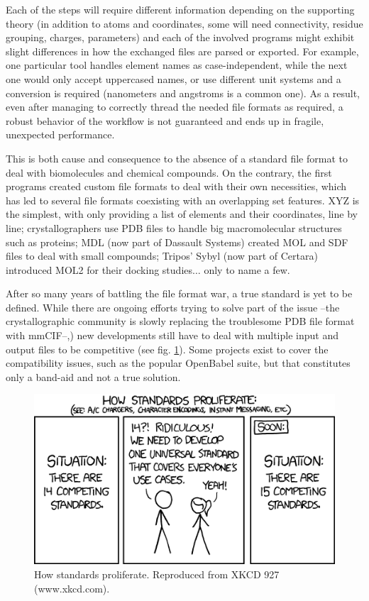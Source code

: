 Each of the steps will require different information depending on the supporting theory (in addition to atoms and coordinates, some will need connectivity, residue grouping, charges, parameters) and each of the involved programs might exhibit slight differences in how the exchanged files are parsed or exported. For example, one particular tool handles element names as case-independent, while the next one would only accept uppercased names, or use different unit systems and a conversion is required (nanometers and angstroms is a common one). As a result, even after managing to correctly thread the needed file formats as required, a robust behavior of the workflow is not guaranteed and ends up in fragile, unexpected performance.

This is both cause and consequence to the absence of a standard file format to deal with biomolecules and chemical compounds. On the contrary, the first programs created custom file formats to deal with their own necessities, which has led to several file formats coexisting with an overlapping set features. XYZ is the simplest, with only providing a list of elements and their coordinates, line by line; crystallographers use PDB files to handle big macromolecular structures such as proteins; MDL (now part of Dassault Systems) created MOL and SDF files to deal with small compounds; Tripos’ Sybyl (now part of Certara) introduced MOL2 for their docking studies$ \ldots $  only to name a few.




After so many years of battling the file format war, a true standard is yet to be defined. While there are ongoing efforts trying to solve part of the issue --the crystallographic community is slowly replacing the troublesome PDB file format with mmCIF--,\cite{bourne1997,berman2007}) new developments still have to deal with multiple input and output files to be competitive (see fig. \ref{fig:xkcd}). Some projects exist to cover the compatibility issues, such as the popular OpenBabel suite, \cite{oboyle2011} but that constitutes only a band-aid and not a true solution.

\begin{figure}[H]
	\includegraphics[width=\textwidth]{./figures/01/xkcd927.png}
	\caption[Proliferation of standards]{How standards proliferate. Reproduced from XKCD 927 (www.xkcd.com).}
	\label{fig:xkcd}
\end{figure}


